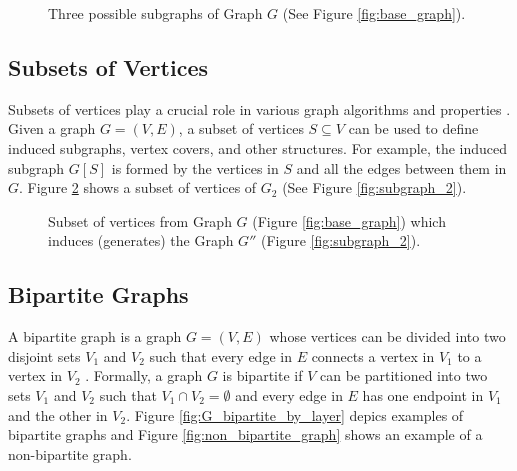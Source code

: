 \begin{figure}[!ht]
                \caption{Three possible subgraphs of Graph $G$ (See Figure \ref{fig:base_graph}).}
                \label{fig:subgraphs}
            \end{figure}
        
        \subsection{Subsets of Vertices}
        
            Subsets of vertices play a crucial role in various graph algorithms and properties \cite{cormen, bondy1976graph}. Given a graph \( G = (V, E) \), a subset of vertices \( S \subseteq V \) can be used to define induced subgraphs, vertex covers, and other structures. For example, the induced subgraph \( G[S] \) is formed by the vertices in \( S \) and all the edges between them in \( G \). Figure \ref{fig:subset_of_vertices} shows a subset of vertices of $G_2$ (See Figure \ref{fig:subgraph_2}).

            \begin{figure}[!ht]
                \centering
                \caption[Subset of vertices from Graph $G$.]{Subset of vertices from Graph $G$ (Figure \ref{fig:base_graph}) which induces (generates) the Graph $G''$ (Figure \ref{fig:subgraph_2}).}
                \label{fig:subset_of_vertices}
            \end{figure}


        \subsection{Bipartite Graphs}

            A bipartite graph is a graph \( G = (V, E) \) whose vertices can be divided into two disjoint sets \( V_1 \) and \( V_2 \) such that every edge in \( E \) connects a vertex in \( V_1 \) to a vertex in \( V_2 \) \cite{cormen, bondy1976graph}.
            Formally, a graph \( G \) is bipartite if \( V \) can be partitioned into two sets \( V_1 \) and \( V_2 \) such that \( V_1 \cap V_2 = \emptyset \) and every edge in \( E \) has one endpoint in \( V_1 \) and the other in \( V_2 \). Figure \ref{fig:G_bipartite_by_layer} depics examples of bipartite graphs and Figure \ref{fig:non_bipartite_graph} shows an example of a non-bipartite graph.
            
